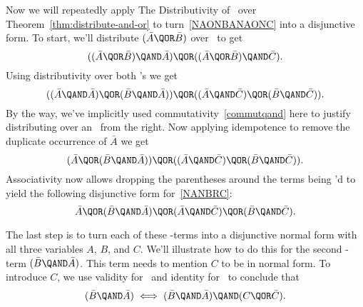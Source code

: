 Now we will repeatedly apply The Distributivity of \QAND\ over \QOR
Theorem~\ref{thm:distribute-and-or} to turn~\eqref{NAONBANAONC} into a
disjunctive form.  To start, we'll distribute $(\bar{A} \QOR \bar{B})$
over \QAND\ to get
\[
((\bar{A} \QOR \bar{B}) \QAND \bar{A}) \QOR ((\bar{A} \QOR \bar{B}) \QAND \bar{C}).
\]
Using distributivity over both \QAND's we get
\[
((\bar{A} \QAND \bar{A}) \QOR (\bar{B} \QAND \bar{A})) \QOR 
((\bar{A} \QAND \bar{C}) \QOR (\bar{B} \QAND \bar{C})).
\]
By the way, we've implicitly used commutativity~\eqref{commutqand}
here to justify distributing over an \QAND\ from the right.  Now
applying idempotence to remove the duplicate occurrence of $\bar{A}$ we
get
\[
(\bar{A} \QOR (\bar{B} \QAND \bar{A})) \QOR 
((\bar{A} \QAND \bar{C}) \QOR (\bar{B} \QAND \bar{C})).
\]
Associativity now allows dropping the parentheses around the terms
being \QOR'd to yield the following disjunctive form for~\eqref{NANBRC}:
\begin{equation}\label{DFNAONBANAONC}
\bar{A} \QOR
(\bar{B} \QAND \bar{A}) \QOR 
(\bar{A} \QAND \bar{C}) \QOR
(\bar{B} \QAND \bar{C}).
\end{equation}

The last step is to turn each of these \QAND-terms into a disjunctive
normal form with all three variables $A$, $B$, and $C$.  We'll
illustrate how to do this for the second \QAND-term
$(\bar{B} \QAND \bar{A})$.  This term needs to mention $C$ to be in
normal form.  To introduce $C$, we use validity for \QOR\ and
identity for \QAND\ to conclude that
\[
(\bar{B} \QAND \bar{A}) \iff (\bar{B} \QAND \bar{A}) \QAND (C \QOR \bar{C}).
\]

\iffalse
$\bar{B} \QAND \bar{A}$
is equivalent to
\[
(\bar{B} \QAND \bar{A}) \QAND (C \QOR \bar{C}).
\]
\fi

